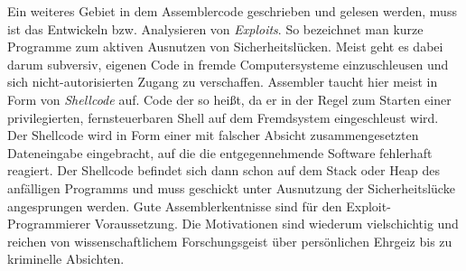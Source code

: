 Ein weiteres Gebiet in dem Assemblercode geschrieben und gelesen werden, muss ist das Entwickeln bzw. Analysieren von \emph{Exploits}. So bezeichnet man kurze Programme zum aktiven Ausnutzen von Sicherheitslücken. Meist geht es dabei darum subversiv, eigenen Code in fremde Computersysteme einzuschleusen und sich nicht-autorisierten Zugang zu verschaffen. Assembler taucht hier meist in Form von \emph{Shellcode} auf. Code der so heißt, da er in der Regel zum Starten einer privilegierten, fernsteuerbaren Shell auf dem Fremdsystem eingeschleust wird. Der Shellcode wird in Form einer mit falscher Absicht zusammengesetzten Dateneingabe eingebracht, auf die die entgegennehmende Software fehlerhaft reagiert. Der Shellcode befindet sich dann schon auf dem Stack oder Heap des anfälligen Programms und muss geschickt unter Ausnutzung der Sicherheitslücke angesprungen werden. Gute Assemblerkentnisse sind für den Exploit-Programmierer Voraussetzung. Die Motivationen sind wiederum vielschichtig und reichen von wissenschaftlichem Forschungsgeist über persönlichen Ehrgeiz bis zu kriminelle Absichten.
